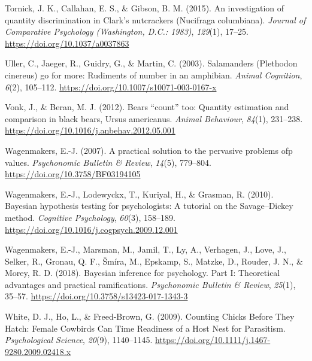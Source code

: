 \documentclass[
  ,pub,floatsintext]{apa6}
\newlength{\cslhangindent}
\newlength{\cslentryspacingunit} %
\newenvironment{CSLReferences}[2] %
 {%
  \setlength{\parindent}{0pt}
  \ifodd #1
  \let\oldpar\par
  \def\par{\hangindent=\cslhangindent\oldpar}
  \fi
  \setlength{\parskip}{#2\cslentryspacingunit}
 }%
 {}
\begin{document}
\begin{CSLReferences}{1}{0}
\leavevmode{}%
Tornick, J. K., Callahan, E. S., \& Gibson, B. M. (2015). An investigation of quantity discrimination in {Clark}'s nutcrackers ({Nucifraga} columbiana). \emph{Journal of Comparative Psychology (Washington, D.C.: 1983)}, \emph{129}(1), 17--25. \url{https://doi.org/10.1037/a0037863}

\leavevmode{}%
Uller, C., Jaeger, R., Guidry, G., \& Martin, C. (2003). Salamanders ({Plethodon} cinereus) go for more: Rudiments of number in an amphibian. \emph{Animal Cognition}, \emph{6}(2), 105--112. \url{https://doi.org/10.1007/s10071-003-0167-x}

\leavevmode{}%
Vonk, J., \& Beran, M. J. (2012). Bears {``count''} too: Quantity estimation and comparison in black bears, {Ursus} americanus. \emph{Animal Behaviour}, \emph{84}(1), 231--238. \url{https://doi.org/10.1016/j.anbehav.2012.05.001}

\leavevmode{}%
Wagenmakers, E.-J. (2007). A practical solution to the pervasive problems ofp values. \emph{Psychonomic Bulletin \& Review}, \emph{14}(5), 779--804. \url{https://doi.org/10.3758/BF03194105}

\leavevmode{}%
Wagenmakers, E.-J., Lodewyckx, T., Kuriyal, H., \& Grasman, R. (2010). Bayesian hypothesis testing for psychologists: {A} tutorial on the {Savage}--{Dickey} method. \emph{Cognitive Psychology}, \emph{60}(3), 158--189. \url{https://doi.org/10.1016/j.cogpsych.2009.12.001}

\leavevmode{}%
Wagenmakers, E.-J., Marsman, M., Jamil, T., Ly, A., Verhagen, J., Love, J., Selker, R., Gronau, Q. F., Šmíra, M., Epskamp, S., Matzke, D., Rouder, J. N., \& Morey, R. D. (2018). Bayesian inference for psychology. {Part I}: {Theoretical} advantages and practical ramifications. \emph{Psychonomic Bulletin \& Review}, \emph{25}(1), 35--57. \url{https://doi.org/10.3758/s13423-017-1343-3}

\leavevmode{}%
White, D. J., Ho, L., \& Freed-Brown, G. (2009). Counting {Chicks Before They Hatch}: {Female Cowbirds Can Time Readiness} of a {Host Nest} for {Parasitism}. \emph{Psychological Science}, \emph{20}(9), 1140--1145. \url{https://doi.org/10.1111/j.1467-9280.2009.02418.x}


\end{CSLReferences}
\end{document}
